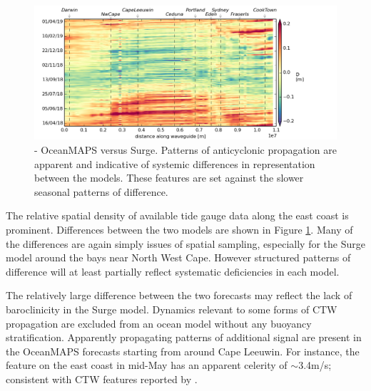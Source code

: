 \begin{figure}[H]\centering
    \noindent\includegraphics[width=\figwidthFull]{figures/plots/interpRdiff_sla_surgeg_day0.png}
    \caption{\CAPTIONc{} - OceanMAPS versus Surge.
             Patterns of anticyclonic propagation are apparent and indicative of systemic differences in representation between the models.   
             These features are set against the slower seasonal patterns of difference.}
    \label{fig:diff_omaps_surge}
\end{figure}
The relative spatial density of available tide gauge data along the east coast is prominent.
Differences between the two models are shown in Figure \ref{fig:diff_omaps_surge}. 
Many of the differences are again simply issues of spatial sampling, especially for the Surge model around the bays near North West Cape.
However structured patterns of difference will at least partially reflect systematic deficiencies in each model.

The relatively large difference between the two forecasts may reflect the lack of baroclinicity in the Surge model.
Dynamics relevant to some forms of CTW propagation are excluded from an ocean model without any buoyancy stratification.   
Apparently propagating patterns of additional signal are present in the OceanMAPS forecasts starting from around Cape Leeuwin.
For instance, the feature on the east coast in mid-May has an apparent celerity of $\sim$3.4m/s; consistent with CTW features reported by \citet{Woodham:2013cl}.


